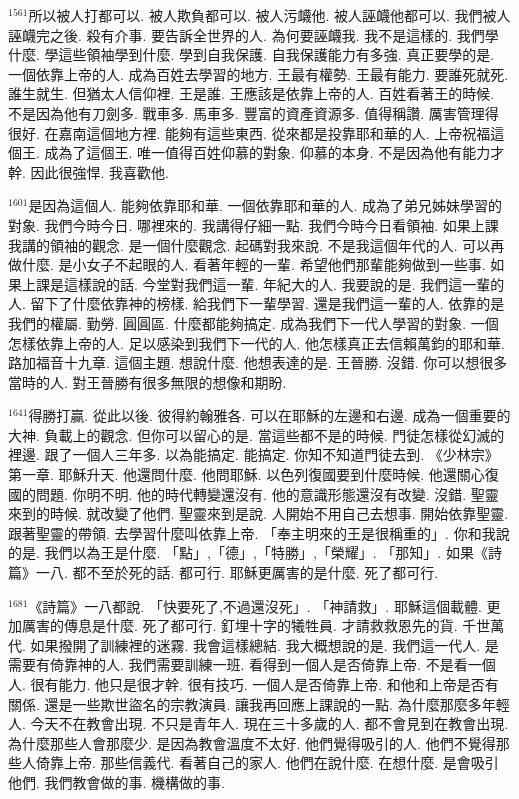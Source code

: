\documentclass{book}
\begin{document}
$^{1561}$所以被人打都可以.
被人欺負都可以.
被人污衊他.
被人誣衊他都可以.
我們被人誣衊完之後.
殺有介事.
要告訴全世界的人.
為何要誣衊我.
我不是這樣的.
我們學什麼.
學這些領袖學到什麼.
學到自我保護.
自我保護能力有多強.
真正要學的是.
一個依靠上帝的人.
成為百姓去學習的地方.
王最有權勢.
王最有能力.
要誰死就死.
誰生就生.
但猶太人信仰裡.
王是誰.
王應該是依靠上帝的人.
百姓看著王的時候.
不是因為他有刀劍多.
戰車多.
馬車多.
豐富的資產資源多.
值得稱讚.
厲害管理得很好.
在嘉南這個地方裡.
能夠有這些東西.
從來都是投靠耶和華的人.
上帝祝福這個王.
成為了這個王.
唯一值得百姓仰慕的對象.
仰慕的本身.
不是因為他有能力才幹.
因此很強悍.
我喜歡他.

$^{1601}$是因為這個人.
能夠依靠耶和華.
一個依靠耶和華的人.
成為了弟兄姊妹學習的對象.
我們今時今日.
哪裡來的.
我講得仔細一點.
我們今時今日看領袖.
如果上課我講的領袖的觀念.
是一個什麼觀念.
起碼對我來說.
不是我這個年代的人.
可以再做什麼.
是小女子不起眼的人.
看著年輕的一輩.
希望他們那輩能夠做到一些事.
如果上課是這樣說的話.
今堂對我們這一輩.
年紀大的人.
我要說的是.
我們這一輩的人.
留下了什麼依靠神的榜樣.
給我們下一輩學習.
還是我們這一輩的人.
依靠的是我們的權屬.
勤勞.
圓圓區.
什麼都能夠搞定.
成為我們下一代人學習的對象.
一個怎樣依靠上帝的人.
足以感染到我們下一代的人.
他怎樣真正去信賴萬鈞的耶和華.
路加福音十九章.
這個主題.
想說什麼.
他想表達的是.
王晉勝.
沒錯.
你可以想很多當時的人.
對王晉勝有很多無限的想像和期盼.

$^{1641}$得勝打贏.
從此以後.
彼得約翰雅各.
可以在耶穌的左邊和右邊.
成為一個重要的大神.
負載上的觀念.
但你可以留心的是.
當這些都不是的時候.
門徒怎樣從幻滅的裡邊.
跟了一個人三年多.
以為能搞定.
能搞定.
你知不知道門徒去到.
《少林宗》第一章.
耶穌升天.
他還問什麼.
他問耶穌.
以色列復國要到什麼時候.
他還關心復國的問題.
你明不明.
他的時代轉變還沒有.
他的意識形態還沒有改變.
沒錯.
聖靈來到的時候.
就改變了他們.
聖靈來到是說.
人開始不用自己去想事.
開始依靠聖靈.
跟著聖靈的帶領.
去學習什麼叫依靠上帝.
「奉主明來的王是很稱重的」.
你和我說的是.
我們以為王是什麼.
「點」,「德」,「特勝」,「榮耀」.
「那知」.
如果《詩篇》一八.
都不至於死的話.
都可行.
耶穌更厲害的是什麼.
死了都可行.

$^{1681}$《詩篇》一八都說.
「快要死了,不過還沒死」.
「神請救」.
耶穌這個載體.
更加厲害的傳息是什麼.
死了都可行.
釘埋十字的犧牲員.
才請救救恩先的貨.
千世萬代.
如果撥開了訓練裡的迷霧.
我會這樣總結.
我大概想說的是.
我們這一代人.
是需要有倚靠神的人.
我們需要訓練一班.
看得到一個人是否倚靠上帝.
不是看一個人.
很有能力.
他只是很才幹.
很有技巧.
一個人是否倚靠上帝.
和他和上帝是否有關係.
還是一些欺世盜名的宗教演員.
讓我再回應上課說的一點.
為什麼那麼多年輕人.
今天不在教會出現.
不只是青年人.
現在三十多歲的人.
都不會見到在教會出現.
為什麼那些人會那麼少.
是因為教會溫度不太好.
他們覺得吸引的人.
他們不覺得那些人倚靠上帝.
那些信義代.
看著自己的家人.
他們在說什麼.
在想什麼.
是會吸引他們.
我們教會做的事.
機構做的事.
\end{document}
